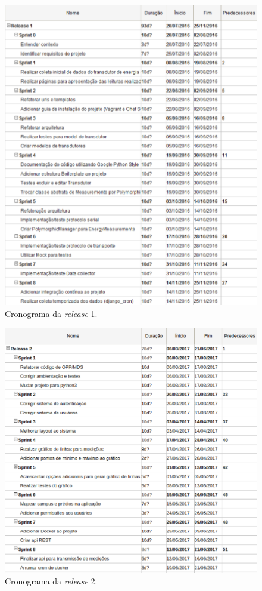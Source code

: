\begin{figure}[!htpb]
    \centering
    \includegraphics[keepaspectratio=true,scale=0.6]{figuras/cronograma.eps}
    \caption{Cronograma da \textit{release} 1.}
    \label{cronograma}
\end{figure}

\begin{figure}[!htpb]
    \centering
    \includegraphics[keepaspectratio=true,scale=0.6]{figuras/cronograma_2.eps}
    \caption{Cronograma da \textit{release} 2.}
    \label{cronograma_2}
\end{figure}